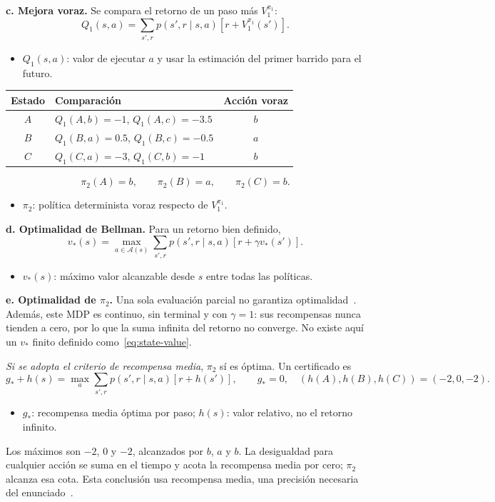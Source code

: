 \textbf{c. Mejora voraz.} Se compara el retorno de un paso más $V^{\pi_1}_1$:
\begin{equation}\label{eq:one-step-action}
    Q_1(s,a)=\sum_{s',r}p(s',r\mid s,a)[r+V^{\pi_1}_1(s')].
\end{equation}
\begin{itemize}
    \item $Q_1(s,a)$: valor de ejecutar $a$ y usar la estimación del primer barrido para el futuro.
\end{itemize}
\begin{center}
\begin{tabular}{clc}
\toprule
Estado & Comparación & Acción voraz\\
\midrule
$A$ & $Q_1(A,b)=-1$, $Q_1(A,c)=-3.5$ & $b$\\
$B$ & $Q_1(B,a)=0.5$, $Q_1(B,c)=-0.5$ & $a$\\
$C$ & $Q_1(C,a)=-3$, $Q_1(C,b)=-1$ & $b$\\
\bottomrule
\end{tabular}
\end{center}
\begin{equation}\label{eq:greedy-policy}
    \pi_2(A)=b,\qquad \pi_2(B)=a,\qquad \pi_2(C)=b.
\end{equation}
\begin{itemize}
    \item $\pi_2$: política determinista voraz respecto de $V^{\pi_1}_1$.
\end{itemize}

\textbf{d. Optimalidad de Bellman.} Para un retorno bien definido,
\begin{equation}\label{eq:bellman-optimal}
    v_*(s)=\max_{a\in\mathcal{A}(s)}\sum_{s',r}p(s',r\mid s,a)
    [r+\gamma v_*(s')].
\end{equation}
\begin{itemize}
    \item $v_*(s)$: máximo valor alcanzable desde $s$ entre todas las políticas.
\end{itemize}

\textbf{e. Optimalidad de $\pi_2$.} Una sola evaluación parcial no garantiza optimalidad~\cite[seccs.~4.2--4.3]{sutton}. Además, este MDP es continuo, sin terminal y con $\gamma=1$: sus recompensas nunca tienden a cero, por lo que la suma infinita del retorno no converge. No existe aquí un $v_*$ finito definido como~\eqref{eq:state-value}.

\emph{Si se adopta el criterio de recompensa media}, $\pi_2$ sí es óptima. Un certificado es
\begin{equation}\label{eq:average-certificate}
    g_*+h(s)=\max_a\sum_{s',r}p(s',r\mid s,a)[r+h(s')],
    \qquad g_*=0,\quad (h(A),h(B),h(C))=(-2,0,-2).
\end{equation}
\begin{itemize}
    \item $g_*$: recompensa media óptima por paso; $h(s)$: valor relativo, no el retorno infinito.
\end{itemize}
Los máximos son $-2$, $0$ y $-2$, alcanzados por $b$, $a$ y $b$. La desigualdad para cualquier acción se suma en el tiempo y acota la recompensa media por cero; $\pi_2$ alcanza esa cota. Esta conclusión usa recompensa media, una precisión necesaria del enunciado~\cite[seccs.~3.3 y 10.3]{sutton}.
